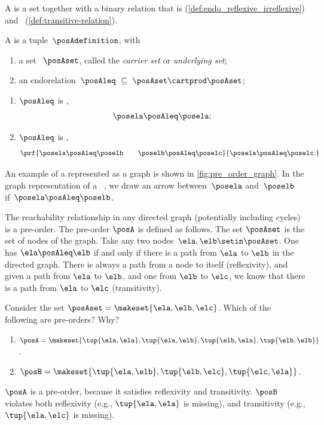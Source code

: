 A  is a set together with a binary relation that is  (\cref{def:endo_reflexive_irreflexive}) and ~(\cref{def:transitive-relation}).
\begin{ctdefinition}
    \label{def:preorder}
    A  is a tuple~$\posAdefinition$, with
    
    \constit
    \begin{enumerate}
    \item a set ~$\posAset$, called the \emph{carrier set} or \emph{underlying set};
    \item an endorelation~$\posAleq \ \subseteq \ \posAset \cartprod \posAset $;
    \end{enumerate}
    \condit 
    \begin{enumerate}
    \item $\posAleq$ is ,
     \begin{equation}
        \posela \posAleq \posela ;
     \end{equation}
    \item $\posAleq$ is ,
     \begin{equation}
            \prf{
        \posela \posAleq \poselb \qquad \poselb \posAleq \poselc
    }{
        \posela \posAleq \poselc .
    }
     \end{equation}
    \end{enumerate}
\end{ctdefinition}

An example of a  represented as a graph is shown in \cref{fig:pre_order_graph}.
In the graph representation of a ~\posA, we draw an arrow between~$\posela$ and~$\poselb$ if~$\posela \posAleq \poselb$.

\begin{example}
    The reachability relationship in any directed graph (potentially including cycles) is a pre-order.
    The pre-order $\posA$ is defined as follows.
    The set $\posAset$ is the set of nodes of the graph.
    Take any two nodes~$\ela,\elb \setin \posAset$.
    One has $\ela \posAleq \elb$ if and only if there is a path from $\ela$ to $\elb$ in the directed graph.
    There is always a path from a node to itself (reflexivity), and given a path from $\ela$ to $\elb$, and one from $\elb$ to $\elc$, we know that there is a path from $\ela$ to $\elc$ (transitivity).
\end{example}

\begin{exercise}
    \label{ex:findpreorders}
    Consider the set $\posAset=\makeset{\ela,\elb,\elc}$.
    Which of the following are pre-orders? Why?
    \begin{enumerate}
        \item $\posA= \makeset{\tup{\ela,\ela},\tup{\ela,\elb},\tup{\elb,\ela},\tup{\elb,\elb}}$.
        \item $\posB= \makeset{\tup{\ela,\elb},\tup{\elb,\elc},\tup{\elc,\ela}}$.
    \end{enumerate}
\end{exercise}

\begin{solution}
    $\posA$ is a pre-order, because it satisfies reflexivity and transitivity.
    $\posB$ violates both reflexivity (e.g., $\tup{\ela,\ela}$ is missing), and transitivity (e.g., $\tup{\ela,\elc}$ is missing).
\end{solution}




